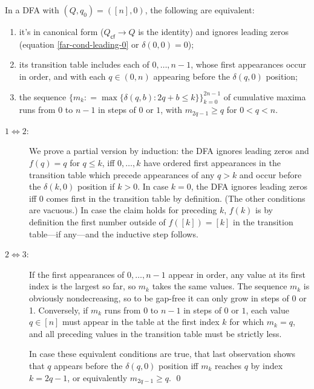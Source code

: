 \begin{lemma}
  \label{far-dfa-canonical form}
  In a DFA with $(Q,q_0)=([n],0)$, the following are equivalent:
  \begin{enumerate}
    \item it's in canonical form ($Q_\textsf{cf}\to Q$ is the identity)
          and ignores leading zeros (equation \eqref{far-cond-leading-0} or $\delta(0,0)=0$);
    \item its transition table includes each of $0,\ldots,n-1$, whose first appearances occur in order,
          and with each $q\in(0,n)$ appearing before the $\delta(q,0)$ position;
    \item the sequence $\{m_k \mathrel{\mathop:}= \max\{\delta(q,b): 2q+b\le k\}\}_{k=0}^{2n-1}$ of cumulative maxima runs from $0$ to $n-1$ in steps of $0$ or $1$,
          with $m_{2q-1}\ge q$ for $0<q<n$.
  \end{enumerate}
\end{lemma}
\proof
\begin{description}
  \item[$1\iff 2$:]
    We prove a partial version by induction:
    the DFA ignores leading zeros and $f(q)=q$ for $q\le k$,
    iff $0,\ldots,k$ have ordered first appearances in the transition table
     which precede appearances of any $q>k$
     and occur before the $\delta(k,0)$ position if $k>0$.
    In case $k=0$, the DFA ignores leading zeros iff $0$ comes first in the transition table by definition.
    (The other conditions are vacuous.)
    In case the claim holds for preceding $k$, $f(k)$ is by definition the first number outside of $f([k])=[k]$ in the transition table---if any---and the inductive step follows.
  \item[$2\iff 3$:]
    If the first appearances of $0,\ldots,n-1$ appear in order, any value at its first index is the largest so far, so $m_k$ takes the same values. The sequence $m_k$ is obviously nondecreasing, so to be gap-free it can only grow in steps of 0 or 1.
    Conversely, if $m_k$ runs from $0$ to $n-1$ in steps of $0$ or $1$, each value $q\in [n]$ must appear in the table at the first index $k$ for which $m_k=q$, and all preceding values in the transition table must be strictly less.

    In case these equivalent conditions are true, that last observation shows that $q$ appears before the $\delta(q,0)$ position iff $m_k$ reaches $q$ by index $k=2q-1$, or equivalently $m_{2q-1}\ge q$.
\qed
\end{description}

